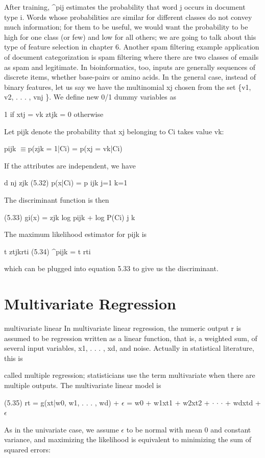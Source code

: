 After training, \textasciicircum{}pij estimates the probability that word j occurs in document type i. Words whose probabilities are similar for different classes do not convey much information; for them to be useful, we would want the probability to be high for one class (or few) and low for all others; we are going to talk about this type of feature selection in chapter 6. Another spam filtering example application of document categorization is spam filtering where there are two classes of emails as spam and legitimate. In bioinformatics, too, inputs are generally sequences of discrete items, whether base-pairs or amino acids. In the general case, instead of binary features, let us say we have the multinomial xj chosen from the set \{v1, v2, . . . , vnj \}. We define new 0/1 dummy variables as

1 if xtj = vk ztjk = 0 otherwise

Let pijk denote the probability that xj belonging to Ci takes value vk:

pijk $\equiv$p(zjk = 1|Ci) = p(xj = vk|Ci)

If the attributes are independent, we have

d nj zjk (5.32) p(x|Ci) = p ijk j=1 k=1

The discriminant function is then

(5.33) gi(x) = zjk log pijk + log P(Ci) j k

The maximum likelihood estimator for pijk is

t ztjkrti (5.34) \textasciicircum{}pijk = t rti

which can be plugged into equation 5.33 to give us the discriminant.

\section{Multivariate Regression}

multivariate linear In multivariate linear regression, the numeric output r is assumed to be regression written as a linear function, that is, a weighted sum, of several input variables, x1, . . . , xd, and noise. Actually in statistical literature, this is

called multiple regression; statisticians use the term multivariate when there are multiple outputs. The multivariate linear model is

(5.35) rt = g(xt|w0, w1, . . . , wd) + $\epsilon$ = w0 + w1xt1 + w2xt2 + $\cdot$ $\cdot$ $\cdot$ + wdxtd + $\epsilon$

As in the univariate case, we assume $\epsilon$ to be normal with mean 0 and constant variance, and maximizing the likelihood is equivalent to minimizing the sum of squared errors:

